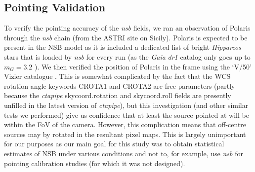 \subsection{Pointing Validation}
To verify the pointing accuracy of the \textit{nsb} fields, we ran an observation of Polaris through the \textit{nsb} chain (from the ASTRI site on Sicily). Polaris is expected to be present in the NSB model as it is included a dedicated list of bright \textit{Hipparcos} stars that is loaded by \textit{nsb} for every run (as the \textit{Gaia} \textit{dr1} catalog only goes up to $m_G=3.2$ \cite{gaiadr1b}). We then verified the position of Polaris in the frame using the `V/50' Vizier catalogue \cite{vizier}. This is somewhat complicated by the fact that the WCS rotation angle keywords CROTA1 and CROTA2 are free parameters (partly because the \textit{ctapipe} skycoord.rotation and skycoord.roll fields are presently unfilled in the latest version of \textit{ctapipe}), but this investigation (and other similar tests we performed) give us confidence that at least the source pointed at will be within the FoV of the camera. However, this complication means that off-centre sources may by rotated in the resultant pixel maps. This is largely unimportant for our purposes as our main goal for this study was to obtain statistical estimates of NSB under various conditions and not to, for example, use \textit{nsb} for pointing calibration studies (for which it was not designed).
